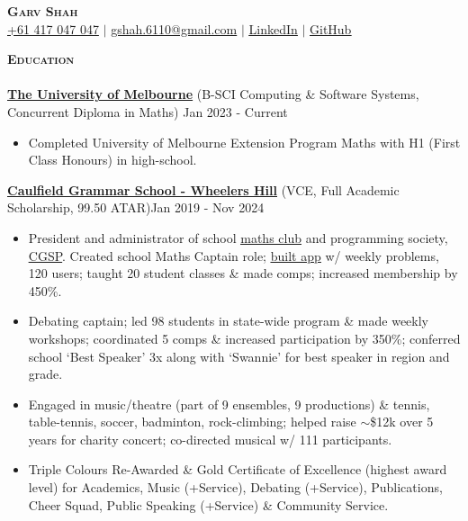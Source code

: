 \documentclass[a4paper]{article}
\newcommand{\lineunder} {
    \vspace*{-8pt} \\
    \hspace*{-10pt} \hrulefill \\
}
\newcommand{\header} [1] {
    {\hspace*{-10pt}\vspace*{6pt} \large\textsc{\textbf{#1}}}
    \vspace*{-6pt} \lineunder
}
\begin{document}

\begin{center}
    \textbf{\Huge \scshape Garv Shah} \\ \vspace{1pt}
    \small \href{tel:+61417047047}{+61 417 047 047} $|$ \href{mailto:gshah.6110@gmail.com}{gshah.6110@gmail.com} $|$
    \href{https://www.linkedin.com/in/garvshah/}{\ul{LinkedIn}} $|$
    \href{https://garv-shah.github.io/}{\ul{GitHub}}
\end{center}
\vspace{-2mm}

\header{Education}
\href{https://www.unimelb.edu.au/}{\textbf{\ul{The University of Melbourne}}} (B-SCI Computing \& Software Systems, Concurrent Diploma in Maths) \hfill Jan 2023 - Current\\
\vspace{-2mm}
\begin{itemize} \itemsep -1pt
\item Completed University of Melbourne Extension Program Maths with H1 (First Class Honours) in high-school.
\end{itemize}
\vspace{-2mm}
\href{https://www.caulfieldgs.vic.edu.au/wheelers-hill/}{\textbf{\ul{Caulfield Grammar School - Wheelers Hill}}} (VCE, Full Academic Scholarship, 99.50 ATAR)\hfill Jan 2019 - Nov 2024\\
\vspace{-2mm}
\begin{itemize} \itemsep -1pt
    \item President and administrator of school \href{https://cgs-math.github.io/}{\ul{maths club}} and programming society, \href{https://cgs-programming.github.io}{\ul{CGSP}}.
    Created school Maths Captain role; \href{https://github.com/cgs-math/app}{\ul{built app}} w/ weekly problems, 120 users; taught 20 student classes \& made comps; increased membership by 450\%.
    \item Debating captain; led 98 students in state-wide program \& made weekly workshops; coordinated 5 comps \& increased participation by 350\%; conferred school ‘Best Speaker’ 3x along with ‘Swannie’ for best speaker in region and grade.
    \item Engaged in music/theatre (part of 9 ensembles, 9 productions) \& tennis, table-tennis, soccer, badminton, rock-climbing; helped raise $\sim$\$12k over 5 years for charity concert; co-directed musical w/ 111 participants.
    \item Triple Colours Re-Awarded \& Gold Certificate of Excellence (highest award level) for Academics, Music (+Service), Debating (+Service), Publications, Cheer Squad, Public Speaking (+Service) \& Community Service.
\end{itemize}
\vspace{-2mm}
\end{document}

